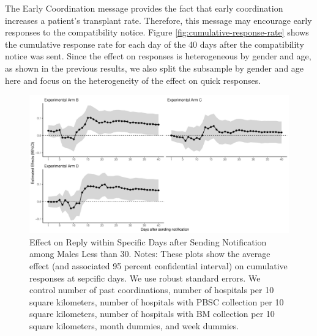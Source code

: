 \documentclass[
]{article}
\begin{document}
The Early Coordination message provides the fact that early coordination increases a patient's transplant rate. Therefore, this message may encourage early responses to the compatibility notice. Figure \ref{fig:cumulative-response-rate} shows the cumulative response rate for each day of the 40 days after the compatibility notice was sent. Since the effect on responses is heterogeneous by gender and age, as shown in the previous results, we also split the subsample by gender and age here and focus on the heterogeneity of the effect on quick responses.

\begin{figure}[t]
\includegraphics{robustness-body_files/figure-latex/young-male-flow-1} \caption{Effect on Reply within Specific Days after Sending Notification among Males Less than 30. Notes: These plots show the average effect (and associated 95 percent confidential interval) on cumulative responses at sepcific days. We use robust standard errors. We control number of past coordinations, number of hospitals per 10 square kilometers, number of hospitals with PBSC collection per 10 square kilometers, number of hospitals with BM collection per 10 square kilometers, month dummies, and week dummies.}\label{fig:young-male-flow}
\end{figure}
\end{document}
